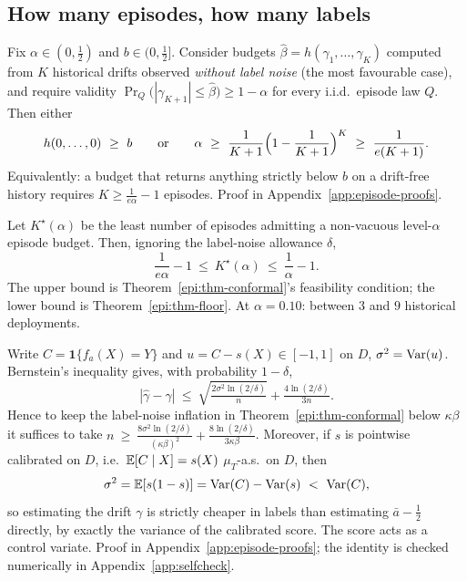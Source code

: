 \subsection{How many episodes, how many labels}

\begin{theorem}\label{epi:thm-floor}
Fix $\alpha\in(0,\tfrac12)$ and $b\in(0,\tfrac12]$. Consider budgets
$\widehat\beta=h(\gamma_1,\dots,\gamma_K)$ computed from $K$ historical drifts observed
\emph{without label noise} (the most favourable case), and require validity
$\Pr_{Q}\bigl(|\gamma_{K+1}|\le\widehat\beta\bigr)\ge1-\alpha$ for every i.i.d.\ episode law $Q$.
Then either
\[
h(0,\dots,0)\ \ge\ b
\qquad\text{or}\qquad
\alpha\ \ge\ \frac1{K+1}\Bigl(1-\frac1{K+1}\Bigr)^{K}\ \ge\ \frac1{e(K+1)} .
\]
Equivalently: a budget that returns anything strictly below $b$ on a drift-free history requires
$K\ge\tfrac1{e\alpha}-1$ episodes. Proof in Appendix~\ref{app:episode-proofs}.
\end{theorem}

\begin{corollary}[Bracket]\label{epi:cor-bracket}
Let $K^\star(\alpha)$ be the least number of episodes admitting a non-vacuous level-$\alpha$
episode budget. Then, ignoring the label-noise allowance $\delta$,
\[
\frac1{e\alpha}-1\ \le\ K^\star(\alpha)\ \le\ \frac1\alpha-1 .
\]
The upper bound is Theorem~\ref{epi:thm-conformal}'s feasibility condition; the lower bound is
Theorem~\ref{epi:thm-floor}. At $\alpha=0.10$: between $3$ and $9$ historical deployments.
\end{corollary}

\begin{proposition}\label{epi:prop-labels}
Write $C=\mathbf 1\{f_a(X)=Y\}$ and $u=C-s(X)\in[-1,1]$ on $D$, $\sigma^2=\operatorname{Var}(u)$. Bernstein's
inequality gives, with probability $1-\delta$,
\[
|\widehat\gamma-\gamma|\ \le\ \sqrt{\tfrac{2\sigma^2\ln(2/\delta)}{n}}+\tfrac{4\ln(2/\delta)}{3n}.
\]
Hence to keep the label-noise inflation in Theorem~\ref{epi:thm-conformal} below $\kappa\beta$ it
suffices to take
$n\ \ge\ \tfrac{8\sigma^2\ln(2/\delta)}{(\kappa\beta)^2}+\tfrac{8\ln(2/\delta)}{3\kappa\beta}$.
Moreover, if $s$ is pointwise calibrated on $D$, i.e.\ $\mathbb{E}[C\mid X]=s(X)$ $\mu_T$-a.s.\ on $D$, then
\[
\sigma^2=\E[s(1-s)]=\Var(C)-\Var(s)\ <\ \Var(C),
\]
so estimating the drift $\gamma$ is strictly cheaper in labels than estimating $\bar a-\tfrac12$
directly, by exactly the variance of the calibrated score. The score acts as a control variate.
Proof in Appendix~\ref{app:episode-proofs}; the identity is checked numerically in
Appendix~\ref{app:selfcheck}.
\end{proposition}

